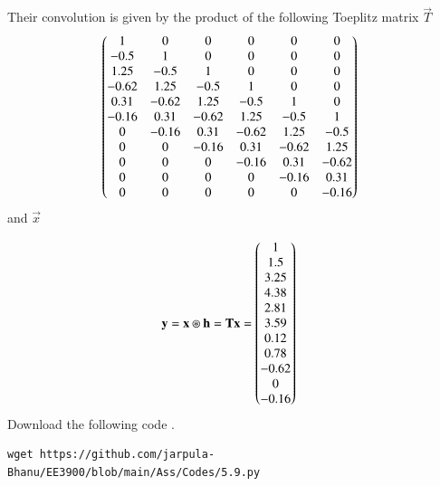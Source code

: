 \documentclass[journal,12pt,twocolumn]{IEEEtran}
\renewcommand\thesection{\arabic{section}}
\begin{document}
\begin{enumerate}[label=\thesection.\arabic*
,ref=\thesection.\theenumi]
Their convolution is given by the product of the following Toeplitz matrix $\vec{T}$
\begin{align}
	&\begin{pmatrix}
		1 & 0 & 0 & 0 & 0 & 0 \\
		-0.5 & 1 & 0 & 0 & 0 & 0 \\
		1.25 & -0.5 & 1 & 0 & 0 & 0 \\
		-0.62 & 1.25 & -0.5 & 1 & 0 & 0 \\
		0.31 & -0.62 & 1.25 & -0.5 & 1 & 0 \\
		-0.16 & 0.31 & -0.62 & 1.25 & -0.5 & 1 \\
		0 & -0.16 & 0.31 & -0.62 & 1.25 & -0.5 \\
		0 & 0 & -0.16 & 0.31 & -0.62 & 1.25 \\
		0 & 0 & 0 & -0.16 & 0.31 & -0.62 \\
		0 & 0 & 0 & 0 & -0.16 & 0.31 \\
		0 & 0 & 0 & 0 & 0 & -0.16 \\
	\end{pmatrix} 
\end{align}
and $\vec{x}$

\begin{align}
	&\mathbf{y} = \mathbf{x} \circledast \mathbf{h} = \mathbf{Tx} = \begin{pmatrix}1 \\ 1.5 \\ 3.25 \\ 4.38 \\ 2.81 \\ 3.59 \\ 0.12 \\ 0.78 \\ -0.62 \\ 0 \\ -0.16\end{pmatrix}
\end{align}
Download the following code .
\begin{lstlisting}
wget https://github.com/jarpula-Bhanu/EE3900/blob/main/Ass/Codes/5.9.py
\end{lstlisting}


\end{enumerate}
\end{document}
